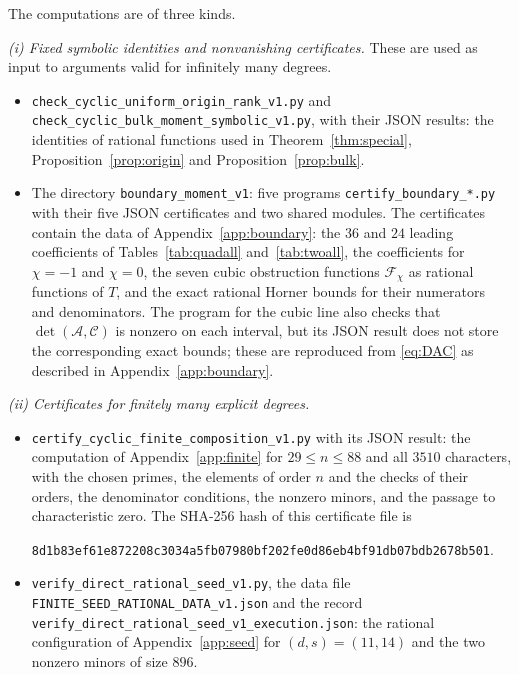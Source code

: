\documentclass{amsart}
\newcommand{\file}[1]{\nolinkurl{#1}}
\theoremstyle{definition}
\theoremstyle{remark}
\numberwithin{equation}{section}
\begin{document}
The computations are of three kinds.

\emph{(i) Fixed symbolic identities and nonvanishing certificates.} These are used as input
to arguments valid for infinitely many degrees.
\begin{itemize}
\item \file{check_cyclic_uniform_origin_rank_v1.py} and
  \file{check_cyclic_bulk_moment_symbolic_v1.py}, with their JSON results: the
  identities of rational functions used in Theorem~\ref{thm:special},
  Proposition~\ref{prop:origin} and Proposition~\ref{prop:bulk}.
\item The directory \file{boundary_moment_v1}: five programs
  \file{certify_boundary_*.py} with their five JSON certificates and two shared modules.
  The certificates contain the data of Appendix~\ref{app:boundary}: the $36$ and $24$
  leading coefficients of Tables~\ref{tab:quadall} and~\ref{tab:twoall}, the coefficients
  for $\chi=-1$ and $\chi=0$, the seven cubic obstruction functions $\mathcal F_\chi$ as
  rational functions of $T$, and the exact rational Horner bounds for their numerators and
  denominators. The program for the cubic line also checks that $\det(\mathcal A,\mathcal C)$
  is nonzero on each interval, but its JSON result does not store the corresponding exact
  bounds; these are reproduced from \eqref{eq:DAC} as described in
  Appendix~\ref{app:boundary}.
\end{itemize}

\emph{(ii) Certificates for finitely many explicit degrees.}
\begin{itemize}
\item \file{certify_cyclic_finite_composition_v1.py} with its JSON result: the
  computation of Appendix~\ref{app:finite} for $29\le n\le88$ and all $3510$ characters,
  with the chosen primes, the elements of order $n$ and the checks of their orders, the
  denominator conditions, the nonzero minors, and the passage to characteristic zero.
  The SHA-256 hash of this certificate file is
  \begin{center}\small\file{8d1b83ef61e872208c3034a5fb07980bf202fe0d86eb4bf91db07bdb2678b501}.\end{center}
\item \file{verify_direct_rational_seed_v1.py}, the data file
  \file{FINITE_SEED_RATIONAL_DATA_v1.json} and the record
  \file{verify_direct_rational_seed_v1_execution.json}: the rational configuration
  of Appendix~\ref{app:seed} for $(d,s)=(11,14)$ and the two nonzero minors of size $896$.
\end{itemize}
\end{document}

